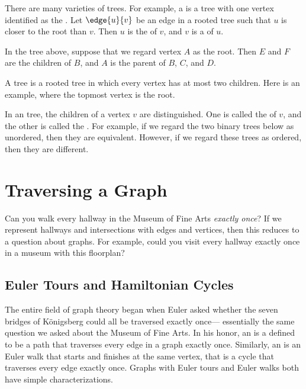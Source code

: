 There are many varieties of trees.  For example, a 
is a tree with one vertex identified as the .  Let
$\edge{u}{v}$ be an edge in a rooted tree such that $u$ is closer to
the root than $v$.  Then $u$ is the  of $v$, and $v$ is
a  of $u$.


In the tree above, suppose that we regard vertex $A$ as the
root.  Then $E$ and $F$ are the children of $B$, and $A$ is the parent
of $B$, $C$, and $D$.

A  tree is a rooted tree in which every vertex has at most
two children.  Here is an example, where the topmost vertex is the
root.


In an  tree, the children of a vertex $v$ are
distinguished.  One is called the  of $v$, and the
other is called the .  For example, if we regard the
two binary trees below as unordered, then they are equivalent.
However, if we regard these trees as ordered, then they are different.

\fi

\iffalse

\section{Traversing a Graph}
Can you walk every hallway in the Museum of Fine Arts {\em exactly
once}?  If we represent hallways and intersections with edges and
vertices, then this reduces to a question about graphs.  For example,
could you visit every hallway exactly once in a museum with this
floorplan?


\subsection{Euler Tours and Hamiltonian Cycles}

The entire field of graph theory began when Euler asked whether the seven
bridges of K\"onigsberg could all be traversed exactly once--- essentially
the same question we asked about the Museum of Fine Arts.  In his honor,
an  is a defined to be a path that traverses every edge
in a graph exactly once.  Similarly, an  is an Euler walk
that starts and finishes at the same vertex, that is a cycle that
traverses every edge exactly once.  Graphs with Euler tours and Euler
walks both have simple characterizations.


